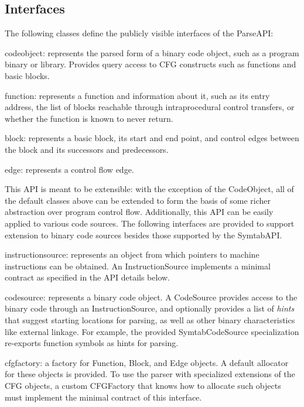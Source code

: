 \documentclass{tufte-handout}
\begin{document}
\subsection{Interfaces}

The following classes define the publicly visible interfaces of the ParseAPI:

\begin{itemize}[label=$\circ$]
{\item {\sc codeobject}: represents the parsed form of a binary code object,
such as a program binary or library. Provides query access to CFG constructs
such as functions and basic blocks.}

{\item {\sc function}: represents a function and information about it, such as
its entry address, the list of blocks reachable through intraprocedural control
transfers, or whether the function is known to never return.}

{\item {\sc block}: represents a basic block, its start and end point, and control edges between the block and its successors and predecessors.}

{\item {\sc edge}: represents a control flow edge.}
\end{itemize}

\noindent
This API is meant to be extensible: with the exception of the CodeObject, all
of the default classes above can be extended to form the basis of some richer
abstraction over program control flow. Additionally, this API can be easily
applied to various code sources. The following interfaces are provided to
support extension to binary code sources besides those supported by the
SymtabAPI.

\begin{itemize}

{\item {\sc instructionsource}: represents an object from which pointers to machine instructions can be obtained. An InstructionSource implements a minimal contract as specified in the API details below.}

{\item {\sc codesource}: represents a binary code object. A CodeSource provides
access to the binary code through an InstructionSource, and optionally provides
a list of \emph{hints} that suggest starting locations for parsing, as well as
other binary characteristics like external linkage. For example, the provided
SymtabCodeSource specialization re-exports function symbols as hints for
parsing.}

{\item {\sc cfgfactory}: a factory for Function, Block, and Edge objects. A default allocator for these objects is provided. To use the parser with specialized extensions of the CFG objects, a custom CFGFactory that knows how to allocate such objects must implement the minimal contract of this interface.}

\end{itemize}
\end{document}
